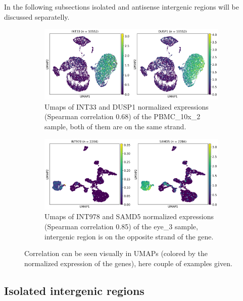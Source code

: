 In the following subsections isolated and antisense intergenic regions will be discussed separatelly.

\begin{figure}[htbp]
    \centering
    \begin{subfigure}{\textwidth}
        \centering
        \includegraphics[width=\textwidth]{images/correlationUmaps/PBMC_10x_2_DUSP1.png}
        \caption{Umaps of INT33 and DUSP1 normalized expressions (Spearman correlation 0.68) of the PBMC\_10x\_2 sample, both of them are on the same strand.}
    \end{subfigure}
    \vspace{0.5em}
    \begin{subfigure}{\textwidth}
        \centering
        \includegraphics[width=\textwidth]{images/correlationUmaps/eye_3_SAMD5.png}
        \caption{Umaps of INT978 and SAMD5 normalized expressions (Spearman correlation 0.85) of the eye\_3 sample,
        intergenic region is on the opposite strand of the gene.}
    \end{subfigure}
    \caption{Correlation can be seen visually in UMAPs (colored by the normalized expression of the genes), here couple of examples given.}
    \label{fig:correlationUmaps}
\end{figure}

\subsection{Isolated intergenic regions}

